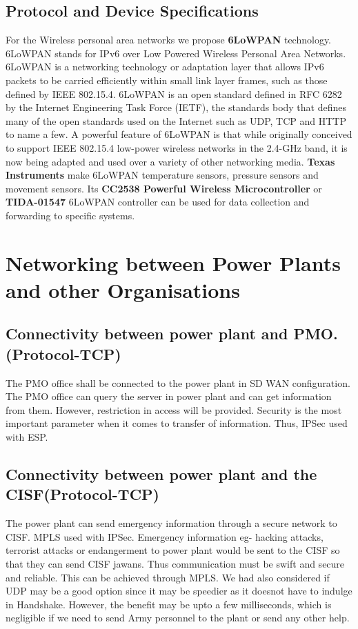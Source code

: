 \documentclass{article}
\begin{document}
\subsection{Protocol and Device Specifications}
For the Wireless personal area networks we propose \textbf{6LoWPAN} technology. 6LoWPAN stands for IPv6 over Low Powered Wireless Personal Area Networks. 6LoWPAN is a networking technology or adaptation layer that allows IPv6 packets to be carried efficiently within small link layer frames, such as those defined by IEEE 802.15.4. 6LoWPAN is an open standard defined in RFC 6282 by the Internet Engineering Task Force (IETF), the standards body that defines many of the open standards used on the Internet such as UDP, TCP and HTTP to name a few. A powerful feature of 6LoWPAN is that while originally conceived to support IEEE 802.15.4 low-power wireless networks in the 2.4-GHz band, it is now being adapted and used over a variety of other networking media. \textbf{Texas Instruments} make 6LoWPAN temperature sensors, pressure sensors and movement sensors. Its \textbf{CC2538 Powerful Wireless Microcontroller} or \textbf{TIDA-01547} 6LoWPAN controller can be used for data collection and forwarding to specific systems.

\section{Networking between Power Plants and other Organisations}

\subsection{Connectivity between power plant and PMO.(Protocol-TCP)}
The PMO office shall be connected to the power plant in SD WAN configuration. The PMO office can query the server in power plant and can get information from them. However, restriction in access will be provided. Security is the most important parameter when it comes to transfer of information. Thus, IPSec used with ESP.




\subsection{Connectivity between power plant and the CISF(Protocol-TCP)}
The power plant can send emergency information through a secure network to CISF. MPLS used with IPSec. Emergency information eg- hacking attacks, terrorist attacks or endangerment to power plant would be sent to the CISF so that they can send CISF jawans. Thus communication must be swift and secure and reliable. This can be achieved through MPLS. We had also considered if UDP may be a good option since it may be speedier as it doesnot have to indulge in Handshake. However, the benefit may be upto a few milliseconds, which is negligible if we need to send Army personnel to the plant or send any other help.
\end{document}
